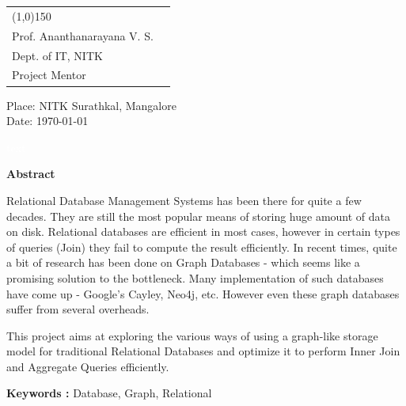 \documentclass[12pt, oneside]{book}
\begin{document}
\\
\\
\begin{tabular}{l@{\hskip 4cm} r}
	\line(1,0){150} \\
	 Prof. Ananthanarayana V. S. \\
	 Dept. of IT, NITK \\
	 Project Mentor \\ 
\end{tabular}

\vspace{4cm}
\begin{flushleft}
Place: NITK Surathkal, Mangalore \\
Date: \today
\end{flushleft}

\pagebreak \textcolor{white}{text}
\thispagestyle{empty}
\begin{center}
	\textbf{ \huge Abstract}
\end{center}
\vspace{1cm}
Relational Database Management Systems has been there for quite a few decades. They are still the most popular means of storing huge amount of data on disk. Relational databases are efficient in most cases, however in certain types of queries (Join) they fail to compute the result efficiently. In recent times, quite a bit of research has been done on Graph Databases - which seems like  a promising solution to the bottleneck. Many implementation of such databases have come up - Google's Cayley, Neo4j, etc. However even these graph databases suffer from several overheads.
\par
This project aims at exploring the various ways of using a graph-like storage model for traditional Relational Databases and optimize it to perform Inner Join and Aggregate Queries efficiently.
\par
\textbf{Keywords : }Database, Graph, Relational

\thispagestyle{empty}
{\listoffigures}
{\listoftables}
{\tableofcontents}

\setcounter{page}{1}
\end{document}
